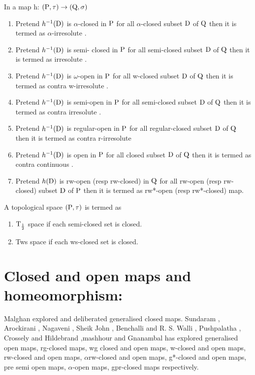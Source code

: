 \begin{dfn}\label{dfn1.3.2} 
In a map h: $(\mathrm{P}, \tau) \rightarrow (\mathrm{Q}, \sigma)$
\begin{enumerate}
\item Pretend $h^{-1}(\mathrm{D})$ is $\alpha$-closed in $\mathrm{P}$ for all $\alpha$-closed subset $\mathrm{D}$ of $\mathrm{Q}$ then it is termed as $\alpha$-irresolute \cite{key14} . 
\item Pretend $h^{-1}(\mathrm{D})$ is semi- closed in $\mathrm{P}$ for all semi-closed subset $\mathrm{D}$ of $\mathrm{Q}$ then it is termed as irresolute \cite{key7} .
\item Pretend $h^{-1}(\mathrm{D})$ is $\omega$-open in $\mathrm{P}$ for all w-closed subset $\mathrm{D}$ of $\mathrm{Q}$ then it is termed as contra w-irresolute \cite{key27} . 
\item Pretend $h^{-1}(\mathrm{D})$ is semi-open in $\mathrm{P}$ for all semi-closed subset $\mathrm{D}$ of $\mathrm{Q}$ then it is termed as contra irresolute \cite{key14} . 
\item Pretend $h^{-1}(\mathrm{D})$ is regular-open in $\mathrm{P}$ for all regular-closed subset $\mathrm{D}$ of $\mathrm{Q}$ then it is termed as contra r-irresolute \cite{key3} 
\item Pretend $h^{-1}(\mathrm{D})$ is open in $\mathrm{P}$ for all closed subset $\mathrm{D}$ of $\mathrm{Q}$ then it is termed as contra continuous \cite{key11} . 
\item Pretend $h(\mathrm{D})$ is rw-open (resp rw-closed) in $\mathrm{Q}$ for all rw-open (resp rw-closed) subset $\mathrm{D}$ of $\mathrm{P}$ then it is termed as rw*-open (resp rw*-closed) \cite{key8} map. 
\end{enumerate}
\end{dfn}


\begin{dfn}\label{dfn1.3.3} 
A topological space $(\mathrm{P}, \tau)$ is termed as 
\begin{enumerate}[\rm i)]
\item ${\rm T}_{\frac{1}{2}}$ space \cite{key23} if each semi-closed set is closed. 
\item Tws space \cite{key7} if each ws-closed set is closed. 
\end{enumerate}
\end{dfn}

\section{Closed and open maps and homeomorphism:}

Malghan \cite{key57} explored and deliberated generalised closed maps. Sundaram \cite{key89}, Arockirani \cite{key3}, Nagaveni \cite{key65}, Sheik John \cite{key83}, Benchalli \cite{key} and R. S. Walli \cite{key}, Pushpalatha \cite{key79}, Crossely and Hildebrand \cite{key20},mashhour \cite{key60} and Gnanambal \cite{key40} has explored generalised open maps, rg-closed maps, wg closed and open maps, w-closed and open maps, rw-closed and open maps, $\alpha$rw-closed and open maps, g*-closed and open maps, pre semi open maps, $\alpha$-open maps, gpr-closed maps respectively.

